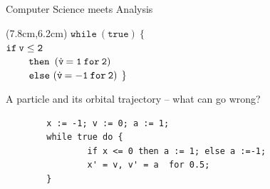\documentclass{beamer}
\begin{document}
\begin{frame}{Computer Science meets Analysis}
\begin{textblock*}{2cm}(7.8cm,6.2cm)
    \scriptsize{$\mathtt{while \> (true) \> \{ }$} \\
    \scriptsize{$\mathtt{\hspace{0.0cm} if \> v \leq 2}$} \\
     \scriptsize{$\hspace{0.8cm} \mathtt{then} \> \hspace{0.1cm}  (\dot{\mathtt{v}} \mathtt{\> = 1 \> for \> 2)}$} \\
    \scriptsize{$\mathtt{\hspace{0.8cm} else \, \,}(\dot{\mathtt{v}}
      \mathtt{\> = -1 \> for \> 2) \>  \> } \}$} 
\end{textblock*}
\end{frame}

\begin{frame}[fragile]{A particle and its orbital trajectory -- what can go wrong?}
        \begin{lstlisting}
        x := -1; v := 0; a := 1;
        while true do {
	            if x <= 0 then a := 1; else a :=-1;
    	        x' = v, v' = a  for 0.5;
        }
        \end{lstlisting}
\end{frame}
\end{document}
